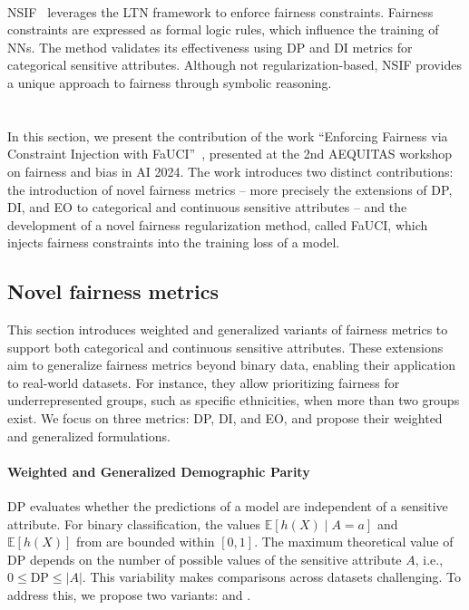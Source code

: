 \paragraph{}
\label{par:ltn-fairness}
%
\Gls{NSIF}~\cite{DBLP:conf/aaaiss/WagnerG21} leverages the \gls{LTN} framework to enforce fairness constraints.
%
Fairness constraints are expressed as formal logic rules, which influence the training of \glspl{NN}.
%
The method validates its effectiveness using \gls{DP} and \gls{DI} metrics for categorical sensitive attributes.
%
Although not regularization-based, \gls{NSIF} provides a unique approach to fairness through symbolic reasoning.


\section[Fairness under constraints injection]{}\label{sec:fauci}
%
In this section, we present the contribution of the work ``Enforcing Fairness via Constraint Injection with FaUCI''~\cite{DBLP:conf/aequitas/MagniniCCO24}, presented at the 2nd AEQUITAS workshop on fairness and bias in \gls{AI} 2024.
%
The work introduces two distinct contributions: the introduction of novel fairness metrics -- more precisely the extensions of \gls{DP}, \gls{DI}, and \gls{EO} to categorical and continuous sensitive attributes -- and the development of a novel fairness regularization method, called \gls{FaUCI}, which injects fairness constraints into the training loss of a model.


\subsection{Novel fairness metrics}\label{subsec:novel-fairness-metrics}
%
This section introduces weighted and generalized variants of fairness metrics to support both categorical and continuous sensitive attributes.
%
These extensions aim to generalize fairness metrics beyond binary data, enabling their application to real-world datasets.
%
For instance, they allow prioritizing fairness for underrepresented groups, such as specific ethnicities, when more than two groups exist.
%
We focus on three metrics: \gls{DP}, \gls{DI}, and \gls{EO}, and propose their weighted and generalized formulations.


\paragraph{Weighted and Generalized Demographic Parity}
%
\Gls{DP} evaluates whether the predictions of a model are independent of a sensitive attribute.
%
For binary classification, the values \( \mathbb{E}[h(X) \mid A = a] \) and \( \mathbb{E}[h(X)] \) from  are bounded within \([0, 1]\).
%
The maximum theoretical value of \gls{DP} depends on the number of possible values of the sensitive attribute \( A \), i.e., \( 0 \leq \text{DP} \leq |A| \).
%
This variability makes comparisons across datasets challenging.
%
To address this, we propose two variants:  and .


